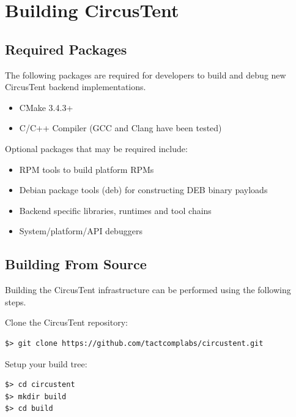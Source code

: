 \documentclass{article}
\begin{document}
\clearpage
\section{Building CircusTent}
\label{sec:Building}

\subsection{Required Packages}
\label{sec:RequiredPackages}

The following packages are required for developers to build and debug 
new CircusTent backend implementations. 

\begin{itemize}
\item CMake 3.4.3+
\item C/C++ Compiler (GCC and Clang have been tested)
\end{itemize}

Optional packages that may be required include:

\begin{itemize}
\item RPM tools to build platform RPMs
\item Debian package tools (deb) for constructing DEB binary payloads
\item Backend specific libraries, runtimes and tool chains
\item System/platform/API debuggers
\end{itemize}

\subsection{Building From Source}
\label{sec:BuildingFromSource}

Building the CircusTent infrastructure can be performed using the following 
steps.

Clone the CircusTent repository:
\begin{verbatim}
$> git clone https://github.com/tactcomplabs/circustent.git
\end{verbatim}

Setup your build tree:
\begin{verbatim}
$> cd circustent
$> mkdir build
$> cd build
\end{verbatim}
\end{document}
